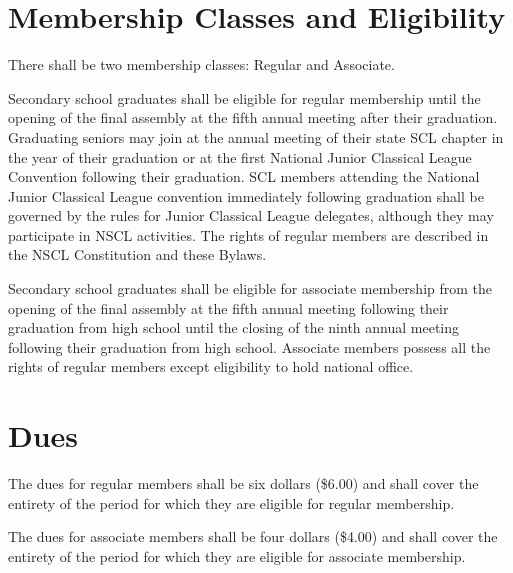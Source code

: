 \documentclass{bylaws_nofont}
\newcommand{\NSCL}{\textsc{NSCL}\xspace}
\newcommand{\SCL}{\textsc{SCL}\xspace}
\begin{document}
\begin{linenumbers}[1]


  \section{Membership Classes and Eligibility}
  There shall be two membership classes: Regular and Associate.
  \begin{enumerate}
    \sub[Regular] Secondary school graduates shall be eligible for
    regular membership until the opening of the final assembly at the
    fifth annual meeting after their graduation. Graduating seniors may
    join at the annual meeting of their state \SCL chapter in the year
    of their graduation or at the first National Junior Classical League
    Convention following their graduation. \SCL members attending the
    National Junior Classical League convention immediately following
    graduation shall be governed by the rules for Junior Classical
    League delegates, although they may participate in \NSCL
    activities. The rights of regular members are described in the \NSCL
    Constitution and these Bylaws.
    
    \sub[Associate] Secondary school graduates shall be eligible for
    associate membership from the opening of the final assembly at the
    fifth annual meeting following their graduation from high school
    until the closing of the ninth annual meeting following their
    graduation from high school. Associate members possess all the
    rights of regular members except eligibility to hold national
    office.\\
  \end{enumerate}

  \section{Dues}
  \begin{enumerate}
    \sub[Regular] The dues for regular members shall be six dollars
    (\$6.00) and shall cover the entirety of the period for which they
    are eligible for regular membership.
    
    \sub[Associate] The dues for associate members shall be four
    dollars (\$4.00) and shall cover the entirety of the period for
    which they are eligible for associate membership.\\
  \end{enumerate}


\end{linenumbers}
\end{document}

